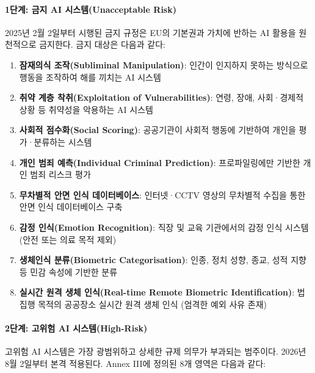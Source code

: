 \paragraph{1단계: 금지 AI 시스템(Unacceptable Risk)}
2025년 2월 2일부터 시행된 금지 규정은 EU의 기본권과 가치에 반하는 AI 활용을 원천적으로 금지한다. 금지 대상은 다음과 같다:

\begin{enumerate}
 \item \textbf{잠재의식 조작(Subliminal Manipulation)}: 인간이 인지하지 못하는 방식으로 행동을 조작하여 해를 끼치는 AI 시스템
 \item \textbf{취약 계층 착취(Exploitation of Vulnerabilities)}: 연령, 장애, 사회·경제적 상황 등 취약성을 악용하는 AI 시스템
 \item \textbf{사회적 점수화(Social Scoring)}: 공공기관이 사회적 행동에 기반하여 개인을 평가·분류하는 시스템
 \item \textbf{개인 범죄 예측(Individual Criminal Prediction)}: 프로파일링에만 기반한 개인 범죄 리스크 평가
 \item \textbf{무차별적 안면 인식 데이터베이스}: 인터넷·CCTV 영상의 무차별적 수집을 통한 안면 인식 데이터베이스 구축
 \item \textbf{감정 인식(Emotion Recognition)}: 직장 및 교육 기관에서의 감정 인식 시스템 (안전 또는 의료 목적 제외)
 \item \textbf{생체인식 분류(Biometric Categorisation)}: 인종, 정치 성향, 종교, 성적 지향 등 민감 속성에 기반한 분류
 \item \textbf{실시간 원격 생체 인식(Real-time Remote Biometric Identification)}: 법 집행 목적의 공공장소 실시간 원격 생체 인식 (엄격한 예외 사유 존재)
\end{enumerate}

\paragraph{2단계: 고위험 AI 시스템(High-Risk)}
고위험 AI 시스템은 가장 광범위하고 상세한 규제 의무가 부과되는 범주이다. 2026년 8월 2일부터 본격 적용된다. Annex III에 정의된 8개 영역은 다음과 같다:

